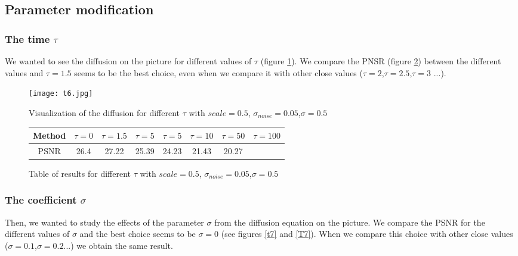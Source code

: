\documentclass{report}
\begin{document}
\subsection{Parameter modification}
\subsubsection{The time $\tau$}


We wanted to see the diffusion on the picture for different values of $\tau$ (figure \ref{t6}). We compare the PNSR (figure \ref{T6}) between the different values and $\tau=1.5$ seems to be the best choice, even when we compare it with other close values ($\tau=2$,$\tau=2.5$,$\tau=3$ ...). \\ 


        \begin{figure}
        \label{t6}
        \centering
        \caption{Visualization of the diffusion for different $\tau$ with $scale=0.5$, $\sigma_{noise}=0.05$,$\sigma=0.5$ }
        \texttt{[image: t6.jpg]}
        \end{figure}
        





        \begin{figure}[h!]
        \label{T6}
        \centering
         \caption{Table of results for different $\tau$ with $scale=0.5$, $\sigma_{noise}=0.05$,$\sigma=0.5$ }
        \begin{tabular}{|c|c|c|c|c|c|c|c|}
        \hline
        Method & $\tau=0$ & $\tau=1.5$ & $\tau=5$ & $\tau=5$ & $\tau=10$ & $\tau=50$ & $\tau=100$
        \\ \hline
         PSNR  & 26.4 & 27.22 & 25.39 & 24.23 & 21.43 & 20.27 \\
         \hline
        \end{tabular}
        \end{figure}






\subsubsection{The coefficient $\sigma$}

Then, we wanted to study the effects of the parameter $\sigma$ from the diffusion equation on the picture. We compare the PSNR for the different values of $\sigma$ and the best choice seems to be $\sigma=0$ (see figures \ref{t7} and \ref{T7}). When we compare this choice with other close values ($\sigma=0.1$,$\sigma=0.2$...) we obtain the same result. 
\end{document}
